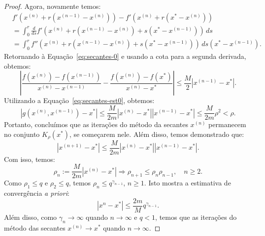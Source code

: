 \begin{proof}
Agora, novamente temos:
\begin{equation}
  \begin{split}
  &f'(x^{(n)} + r(x^{(n-1)} - x^{(n)})) - f'(x^{(n)} + r(x^* - x^{(n)}))\\
  &= \int_0^r \frac{d}{ds}f'(x^{(n)} + r(x^{(n-1)} - x^{(n)}) + s(x^* - x^{(n-1)}))\,ds\\
  &= \int_0^r f''(x^{(n)} + r(x^{(n-1)} - x^{(n)}) + s(x^* - x^{(n-1)}))\,ds(x^* - x^{(n-1)}).
  \end{split}
\end{equation}
Retornando à Equação~\eqref{eq:secantes-0} e usando a cota para a segunda derivada, obtemos:
\begin{equation}
  \left|\frac{f(x^{(n)}) - f(x^{(n-1)})}{x^{(n)} - x^{(n-1)}} - \frac{f(x^{(n)}) - f(x^*)}{x^{(n)} - x^*} \right| \leq \frac{M}{2}|x^{(n-1)} - x^*|.
\end{equation}
Utilizando a Equação~\eqref{eq:secantes-est0}, obtemos:
\begin{equation}
  |g(x^{(n)},x^{(n-1)})-x^*| \leq \frac{M}{2m}|x^{(n)}-x^*||x^{(n-1)}-x^*| \leq \frac{M}{2m}\rho^2 < \rho.
\end{equation}
Portanto, concluímos que as iterações do método da secantes $x^{(n)}$ permanecem no conjunto $K_\rho(x^*)$, se começarem nele. Além disso, temos demonstrado que:
\begin{equation}
  |x^{(n+1)} - x^*| \leq \frac{M}{2m}|x^{(n)} - x^*||x^{(n-1)} - x^*|.
\end{equation}
Com isso, temos:
\begin{equation}
  \rho_n := \frac{M}{2m}|x^{(n)} - x^*| \Rightarrow \rho_{n+1} \leq \rho_{n}\rho_{n-1},\quad n\geq 2.
\end{equation}
Como $\rho_1 \leq q$ e $\rho_2 \leq q$, temos $\rho_n \leq q^{\gamma_{n-1}}$, $n\geq 1$. Isto mostra a estimativa de convergência \emph{a priori}:
\begin{equation}
  |x^{n} - x^*| \leq \frac{2m}{M}q^{\gamma_{n-1}}.
\end{equation}
Além disso, como $\gamma_{n}\to \infty$ quando $n\to\infty$ e $q < 1$, temos que as iterações do método das secantes $x^{(n)}\to x^*$ quando $n\to \infty$.


\end{proof}
